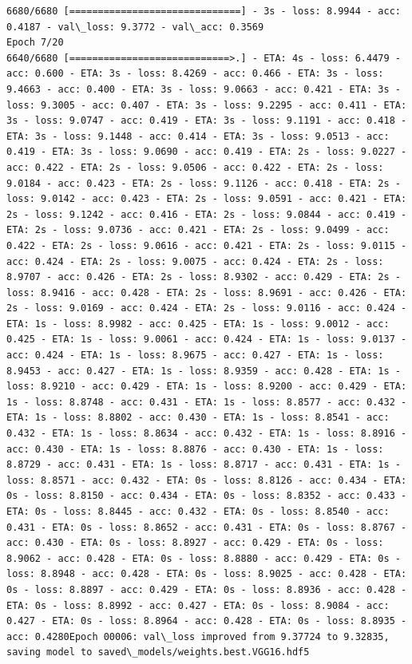 \documentclass[11pt]{article}
\begin{document}
\begin{Verbatim}[commandchars=\\\{\}]
6680/6680 [==============================] - 3s - loss: 8.9944 - acc: 0.4187 - val\_loss: 9.3772 - val\_acc: 0.3569
Epoch 7/20
6640/6680 [============================>.] - ETA: 4s - loss: 6.4479 - acc: 0.600 - ETA: 3s - loss: 8.4269 - acc: 0.466 - ETA: 3s - loss: 9.4663 - acc: 0.400 - ETA: 3s - loss: 9.0663 - acc: 0.421 - ETA: 3s - loss: 9.3005 - acc: 0.407 - ETA: 3s - loss: 9.2295 - acc: 0.411 - ETA: 3s - loss: 9.0747 - acc: 0.419 - ETA: 3s - loss: 9.1191 - acc: 0.418 - ETA: 3s - loss: 9.1448 - acc: 0.414 - ETA: 3s - loss: 9.0513 - acc: 0.419 - ETA: 3s - loss: 9.0690 - acc: 0.419 - ETA: 2s - loss: 9.0227 - acc: 0.422 - ETA: 2s - loss: 9.0506 - acc: 0.422 - ETA: 2s - loss: 9.0184 - acc: 0.423 - ETA: 2s - loss: 9.1126 - acc: 0.418 - ETA: 2s - loss: 9.0142 - acc: 0.423 - ETA: 2s - loss: 9.0591 - acc: 0.421 - ETA: 2s - loss: 9.1242 - acc: 0.416 - ETA: 2s - loss: 9.0844 - acc: 0.419 - ETA: 2s - loss: 9.0736 - acc: 0.421 - ETA: 2s - loss: 9.0499 - acc: 0.422 - ETA: 2s - loss: 9.0616 - acc: 0.421 - ETA: 2s - loss: 9.0115 - acc: 0.424 - ETA: 2s - loss: 9.0075 - acc: 0.424 - ETA: 2s - loss: 8.9707 - acc: 0.426 - ETA: 2s - loss: 8.9302 - acc: 0.429 - ETA: 2s - loss: 8.9416 - acc: 0.428 - ETA: 2s - loss: 8.9691 - acc: 0.426 - ETA: 2s - loss: 9.0169 - acc: 0.424 - ETA: 2s - loss: 9.0116 - acc: 0.424 - ETA: 1s - loss: 8.9982 - acc: 0.425 - ETA: 1s - loss: 9.0012 - acc: 0.425 - ETA: 1s - loss: 9.0061 - acc: 0.424 - ETA: 1s - loss: 9.0137 - acc: 0.424 - ETA: 1s - loss: 8.9675 - acc: 0.427 - ETA: 1s - loss: 8.9453 - acc: 0.427 - ETA: 1s - loss: 8.9359 - acc: 0.428 - ETA: 1s - loss: 8.9210 - acc: 0.429 - ETA: 1s - loss: 8.9200 - acc: 0.429 - ETA: 1s - loss: 8.8748 - acc: 0.431 - ETA: 1s - loss: 8.8577 - acc: 0.432 - ETA: 1s - loss: 8.8802 - acc: 0.430 - ETA: 1s - loss: 8.8541 - acc: 0.432 - ETA: 1s - loss: 8.8634 - acc: 0.432 - ETA: 1s - loss: 8.8916 - acc: 0.430 - ETA: 1s - loss: 8.8876 - acc: 0.430 - ETA: 1s - loss: 8.8729 - acc: 0.431 - ETA: 1s - loss: 8.8717 - acc: 0.431 - ETA: 1s - loss: 8.8571 - acc: 0.432 - ETA: 0s - loss: 8.8126 - acc: 0.434 - ETA: 0s - loss: 8.8150 - acc: 0.434 - ETA: 0s - loss: 8.8352 - acc: 0.433 - ETA: 0s - loss: 8.8445 - acc: 0.432 - ETA: 0s - loss: 8.8540 - acc: 0.431 - ETA: 0s - loss: 8.8652 - acc: 0.431 - ETA: 0s - loss: 8.8767 - acc: 0.430 - ETA: 0s - loss: 8.8927 - acc: 0.429 - ETA: 0s - loss: 8.9062 - acc: 0.428 - ETA: 0s - loss: 8.8880 - acc: 0.429 - ETA: 0s - loss: 8.8948 - acc: 0.428 - ETA: 0s - loss: 8.9025 - acc: 0.428 - ETA: 0s - loss: 8.8897 - acc: 0.429 - ETA: 0s - loss: 8.8936 - acc: 0.428 - ETA: 0s - loss: 8.8992 - acc: 0.427 - ETA: 0s - loss: 8.9084 - acc: 0.427 - ETA: 0s - loss: 8.8964 - acc: 0.428 - ETA: 0s - loss: 8.8935 - acc: 0.4280Epoch 00006: val\_loss improved from 9.37724 to 9.32835, saving model to saved\_models/weights.best.VGG16.hdf5

\end{Verbatim}
\end{document}

